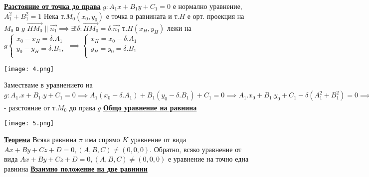 \documentclass{article}
\begin{document}
\textbf{\underline{Разстояние от точка до права}} \newline\newline
$g: A_1x + B_1y + C_1 = 0$ е нормално уравнение, $A_1^2 + B_1^2 = 1$ \newline\newline
Нека т.$M_0(x_0, y_0)$ е точка в равнината и т.$H$ е орт. проекция на $M_0$ в $g$ \newline
$\vec{HM_0} \parallel \vec{n_1} \implies \exists ! \delta: \vec{HM_0} = \delta . \vec{n_1}$
т.$H(x_H, y_H)$ лежи на \newline\newline $g \begin{cases}
    x_0 - x_H = \delta . A_1\\
    y_0 - y_H = \delta . B_1,\\
\end{cases} \implies \begin{cases}
    x_H = x_0 - \delta . A_1\\
    y_H = y_0 = \delta . B_1\\
\end{cases}$ \newline\newline
\begin{center}
    \texttt{[image: 4.png]}
\end{center}
Заместваме в уравнението на $g: A_1.x + B_1.y + C_1 = 0 \implies A_1(x_0 - \delta.A_1) + B_1(y_0 - \delta.B_1) +
C_1 = 0 \implies A_1.x_0 + B_1.y_0 + C_1 - \delta(A_1^2 + B_1^2) = 0 \implies \delta = A_1.x_0 + B_1.y_0 + C_1 =
\frac{A.x_0 + B.y_0 + C}{\sqrt{A^2 + B^2}}$ - разстояние от т.$M_0$ до права $g$ \newline\newline
\textbf{\underline{Общо уравнение на равнина}} \newline\newline
\begin{center}
    \texttt{[image: 5.png]}
\end{center}
\textbf{\underline{Теорема}} \newline
Всяка равнина $\pi$ има спрямо $K$ уравнение от вида $Ax + By + Cz + D = 0, (A, B, C) \neq (0, 0, 0)$.
Обратно, всяко уравнение от вида $Ax + By + Cz + D = 0, (A, B, C) \neq (0, 0, 0)$ е уравнение на точно една
равнина\newline\newline
\textbf{\underline{Взаимно положение на две равнини}} \newline\newline
\end{document}
